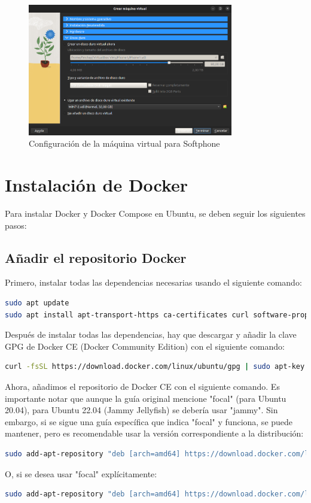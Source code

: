 \begin{figure}[H]
	\centering
	\includegraphics[width=0.8\textwidth]{images/softphone_3.png}
	\caption{Configuración de la máquina virtual para Softphone}
	\label{fig:softphone_3}
\end{figure}

\section{Instalación de Docker}
\label{Apendice1:instalacion_docker}
Para instalar Docker \cite{docker_ubuntu} y Docker Compose \cite{docker_compose_ubuntu} en Ubuntu, se deben seguir los siguientes pasos:

\subsection{Añadir el repositorio Docker}
Primero, instalar todas las dependencias necesarias usando el siguiente comando:
\begin{lstlisting}[language=bash]
sudo apt update
sudo apt install apt-transport-https ca-certificates curl software-properties-common -y
\end{lstlisting}

Después de instalar todas las dependencias, hay que descargar y añadir la clave GPG de Docker CE (Docker Community Edition) con el siguiente comando:
\begin{lstlisting}[language=bash]
curl -fsSL https://download.docker.com/linux/ubuntu/gpg | sudo apt-key add -
\end{lstlisting}

Ahora, añadimos el repositorio de Docker CE con el siguiente comando. Es importante notar que aunque la guía original mencione "focal" (para Ubuntu 20.04), para Ubuntu 22.04 (Jammy Jellyfish) se debería usar "jammy". Sin embargo, si se sigue una guía específica que indica "focal" y funciona, se puede mantener, pero es recomendable usar la versión correspondiente a la distribución:
\begin{lstlisting}[language=bash]
sudo add-apt-repository "deb [arch=amd64] https://download.docker.com/linux/ubuntu $(lsb_release -cs) stable"
\end{lstlisting}
O, si se desea usar "focal" explícitamente:
\begin{lstlisting}[language=bash]
sudo add-apt-repository "deb [arch=amd64] https://download.docker.com/linux/ubuntu focal stable"
\end{lstlisting}

